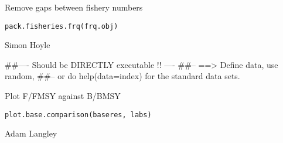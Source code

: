 \documentclass[a4paper]{book}
\begin{document}
%
\begin{Description}\relax

Remove gaps between fishery numbers
\end{Description}
%
\begin{Usage}
\begin{verbatim}
pack.fisheries.frq(frq.obj)
\end{verbatim}
\end{Usage}
%
\begin{Arguments}
\begin{ldescription}
\item[\code{frq.obj}] 


\end{ldescription}
\end{Arguments}
%
\begin{Author}\relax

Simon Hoyle
\end{Author}
%
\begin{Examples}
\begin{ExampleCode}
##---- Should be DIRECTLY executable !! ----
##-- ==>  Define data, use random,
##--	or do  help(data=index)  for the standard data sets.

\end{ExampleCode}
\end{Examples}
%
\begin{Description}\relax

Plot F/FMSY against B/BMSY 
\end{Description}
%
\begin{Usage}
\begin{verbatim}
plot.base.comparison(baseres, labs)
\end{verbatim}
\end{Usage}
%
\begin{Arguments}
\begin{ldescription}
\item[\code{baseres}] 


\item[\code{labs}] 


\end{ldescription}
\end{Arguments}
%
\begin{Author}\relax

Adam Langley
\end{Author}
\end{document}
